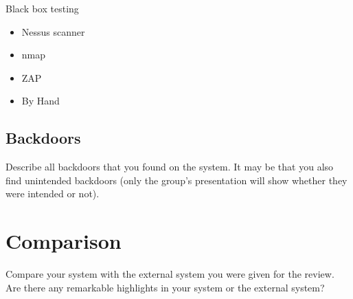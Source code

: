 \documentclass[english]{article}
\begin{document}
Black box testing
\begin{itemize}
	
	\item Nessus scanner
	\item nmap
	\item ZAP
	\item By Hand

\end{itemize}



\subsection{Backdoors}

Describe all backdoors that you found on the system. It may be that you also find unintended backdoors (only the group's presentation will show whether they were intended or not).



\section{Comparison}

Compare your system with the external system you were given for the review. Are there any remarkable highlights in your system or the external system?
\end{document}
